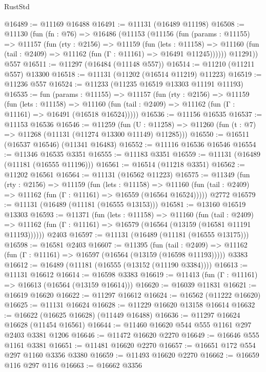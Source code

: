 \begin{lexlean}{RustStd}
\begin{coremodule}
@16489 := @11169 @16488
@16491 := @11131 (@16489 @11198)
@16508 := @11130
    (fun (fn : @76) =>
    @16486
      (@11153
        (@11156
          (fun (params : @11155) =>
          @11157
            (fun (rty : @2156) =>
            @11159
              (fun (lets : @11158) =>
              @11160 (fun (tail : @2409) => @11162 (fun (Γ : @11161) => @16491 @11245))))))
        @11291))
    @557
@16511 := @11297 (@16484 (@11148 @557))
@16514 := @11210 (@11211 @557) @13300
@16518 := @11131 (@11202 (@16514 @11219) @11223)
@16519 := @11236 @557
@16524 := @11233 (@11235 @16519 @13303 @11191 @11193)
@16535 := fun (params : @11155) =>
  @11157
    (fun (rty : @2156) =>
    @11159
      (fun (lets : @11158) =>
      @11160 (fun (tail : @2409) => @11162 (fun (Γ : @11161) => @16491 (@16518 @16524)))))
@16536 := @11156 @16535
@16537 := @11153 @16536
@16546 := @11259
    (fun (U : @11258) => @11260 (fun (t : @7) => @11268 (@11131 (@11274 @13300 @11149) @11285)))
@16550 := @16511 (@16537 @16546) (@11341 @16483)
@16552 := @11116 @16536 @16546
@16554 := @11346 @16535 @3351
@16555 := @11183 @3351
@16559 := @11131 (@16489 (@11181 (@16555 @11196)))
@16561 := @16514 (@11218 @3351)
@16562 := @11202 @16561
@16564 := @11131 (@16562 @11223)
@16575 := @11349
    (fun (rty : @2156) =>
    @11159
      (fun (lets : @11158) =>
      @11160 (fun (tail : @2409) => @11162 (fun (Γ : @11161) => @16559 (@16564 @16524)))))
    @2772
@16579 := @11131 (@16489 (@11181 (@16555 @13153)))
@16581 := @13160 @16519 @13303
@16593 := @11371
    (fun (lets : @11158) =>
    @11160
      (fun (tail : @2409) =>
      @11162 (fun (Γ : @11161) => @16579 (@16564 (@13159 (@16581 @11191 @11193))))))
    @2403
@16597 := @11131 (@16489 (@11181 (@16555 @13175)))
@16598 := @16581 @2403
@16607 := @11395
    (fun (tail : @2409) => @11162 (fun (Γ : @11161) => @16597 (@16564 (@13159 (@16598 @11193)))))
    @3383
@16612 := @16489 (@11181 (@16555 (@13152 (@11190 @3384))))
@16613 := @11131 @16612
@16614 := @16598 @3383
@16619 := @11413 (fun (Γ : @11161) => @16613 (@16564 (@13159 @16614)))
@16620 := @16039 @11831
@16621 := @16619 @16620
@16622 := @11297 @16612
@16624 := @16562 (@11222 @16620)
@16625 := @11131 @16624
@16628 := @11229 @16620 @13158 @16614
@16632 := @16622 (@16625 @16628) (@11449 @16488)
@16636 := @11297 @16624 @16628 (@11454 @16561)
@16644 := @11460 @16620 @544 @555 @1161 @297 @2403 @3381 @1206
@16646 := @11472 @16620 @2270
@16649 := @16646 @555 @1161 @3381
@16651 := @11481 @16620 @2270
@16657 := @16651 @172 @554 @297 @1160 @3356 @3380
@16659 := @11493 @16620 @2270
@16662 := @16659 @116 @297 @116
@16663 := @16662 @3356

\end{coremodule}
\end{lexlean}
